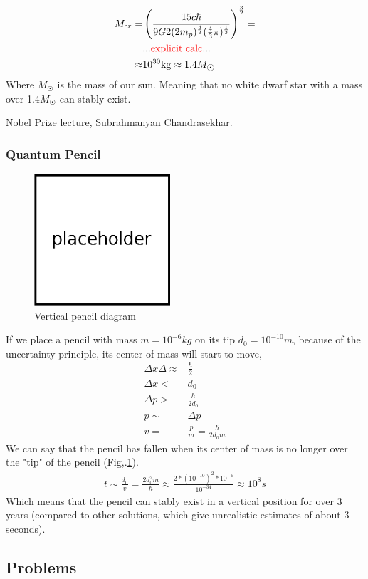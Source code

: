 			\begin{align}
				M_{cr} =& \left( \frac{15 c \hbar}{9 G 2(2m_p)^{\frac{4}{3}}(\frac{4}{3} \pi)^{\frac{1}{3}}} \right)^{\frac{3}{2}} = \\
				&... \hl{\text{explicit calc}} ... \nonumber\\ 
				\approx& 10^{30} \si{kg} \approx 1.4 M_{\astrosun}
			\end{align} 
			Where $M_{\astrosun}$ is the mass of our sun. Meaning that no white dwarf star with a mass over 1.4$M_{\astrosun}$ can stably exist.
			
			Nobel Prize lecture, Subrahmanyan Chandrasekhar\cite{chandrasekhar1984stars}.
		\subsubsection{Quantum Pencil}
			\begin{figure}[!h]
				\centering
				\includegraphics[width=0.45\textwidth]{./figs/placeholder.eps}
				\caption{Vertical pencil diagram}
				\label{pencil}
			\end{figure}
			
			If we place a pencil with mass $m = 10^{-6}\si{kg}$ on its tip $d_0 = 10^{-10}\si{m}$, because of the uncertainty principle, its center of mass will start to move,
			\begin{align}
				\Delta x \Delta \approx& \frac{\hbar}{2} \\
				\Delta x <& d_0 \\
				\Delta p >& \frac{\hbar}{2 d_0} \\
				p \sim& \Delta p \\
				v =& \frac{p}{m} = \frac{\hbar}{2 d_0 m}
			\end{align}
			We can say that the pencil has fallen when its center of mass is no longer over the "tip" of the pencil (Fig,.\ref{pencil}).
			\begin{align}
				t \sim \frac{d_0}{v} = \frac{2d_0^2m}{\hbar} \approx \frac{2 * (10^{-10})^2 * 10^{-6}}{10^{-34}} \approx 10^8 \si{s}
			\end{align}
			Which means that the pencil can stably exist in a vertical position for over 3 years (compared to other solutions, which give unrealistic estimates of about 3 seconds)\cite{easton2007quantum}.
		
	\subsection{Problems}